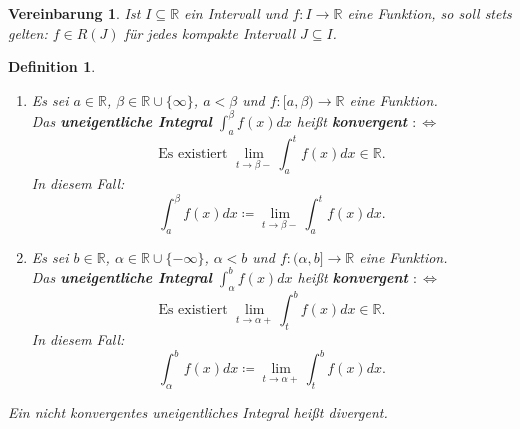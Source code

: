 \documentclass[12pt]{extreport} %
\newcommand{\R}{\mathbb{R}}
\theoremstyle{named}
\theoremstyle{itshape}
\newtheorem*{definition}{Definition}
\theoremstyle{normal}
\newtheorem*{vereinbarung}{Vereinbarung}
\begin{document}
{\begin{vereinbarung}
	Ist $I \subseteq \R$ ein Intervall und $f \colon I \rightarrow \R$ eine Funktion, so soll stets gelten: $f \in R(J)$ für jedes kompakte Intervall $J \subseteq I$.	
\end{vereinbarung}

 
\begin{definition} ~\
	\begin{enumerate}
		\item Es sei $a \in \R$, $\beta \in \R \cup \{ \infty \}$, $a < \beta$ und $f \colon [a, \beta) \rightarrow \R$ eine Funktion. \\
		        Das \textbf{uneigentliche Integral} $\int_{a}^{\beta} f(x) dx$ hei{\ss}t \textbf{konvergent}  $: \iff$ 
			$$  \text{Es existiert } \lim_{t \rightarrow \beta-} \int_{a}^{t} f(x) dx  \in \R.$$
			In diesem Fall:
			$$ \int_{a}^{\beta} f(x) dx \coloneqq \lim_{t \rightarrow \beta- } \int_{a}^{t} f(x) dx. $$
		\item Es sei $b \in \R$, $\alpha \in \R \cup \{ -\infty \}$, $\alpha < b$ und $f \colon (\alpha, b] \rightarrow \R$ eine Funktion. \\
		        Das \textbf{uneigentliche Integral} $\int_{\alpha}^{b} f(x) dx$ hei{\ss}t \textbf{konvergent} $:\iff$ 
			$$ \text{Es existiert } \lim_{t \rightarrow \alpha + } \int_{t}^{b} f(x) dx \in \R. $$
			In diesem Fall:
			$$ \int_{\alpha}^{b} f(x) dx \coloneqq \lim_{t \rightarrow \alpha +} \int_{t}^{b} f(x) dx. $$
	\end{enumerate}
	Ein nicht konvergentes uneigentliches Integral hei{\ss}t divergent.
	
\end{definition}


}
\end{document}
